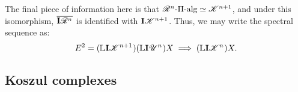 \documentclass[11pt]{article}
\newcommand{\LL}[1]{{\scrK}^{#1}}%
\newcommand{\PR}[1]{\scrR^{#1}}%
\newcommand{\nontop}[1]{\scrU^{#1}}%
\newcommand{\PiAlg}[1]{#1\textup{-$\Pi$-alg}}
\newcommand{\Ind}[2][]{\mathbf{I}{#2}_{#1}}%
\newcommand{\derived}{\mathbb{L}}
\begin{document}
The final piece of information here is that $\PiAlg{\PR{n}}\simeq\LL{n+1}$, and under this isomorphism, $\overline{\Ind{\PR{n}}}$ is identified with $\Ind{\LL{n+1}}$. Thus, we may write the spectral sequence as:
\[E^2=(\derived{\Ind{\LL{n+1}}})(\derived\Ind{\nontop{n}})X\implies(\derived\Ind{\LL{n}})X.\]

\subsection*{Koszul complexes}




\end{document}
